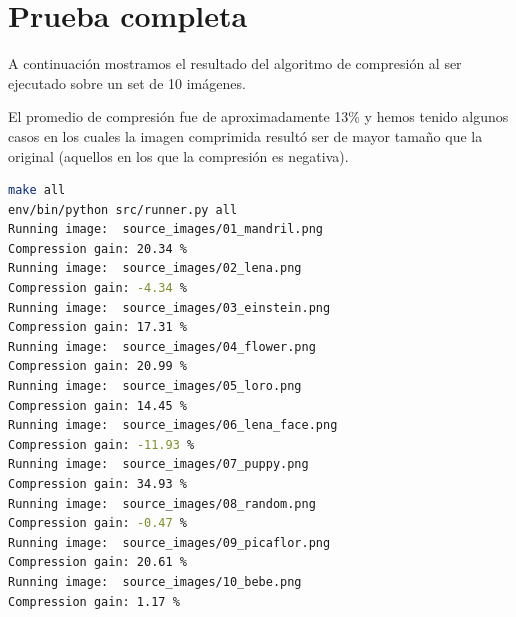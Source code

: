 \documentclass[spanish]{scrartcl}
\begin{document}
\section{Prueba completa}

A continuación mostramos el resultado del algoritmo de compresión al ser ejecutado sobre un set de 10 imágenes.

El promedio de compresión fue de aproximadamente 13\% y hemos tenido algunos casos en los cuales la imagen comprimida resultó ser de mayor tamaño que la original (aquellos en los que la compresión es negativa).

\begin{lstlisting}[language=bash]
make all
env/bin/python src/runner.py all
Running image:  source_images/01_mandril.png
Compression gain: 20.34 %
Running image:  source_images/02_lena.png
Compression gain: -4.34 %
Running image:  source_images/03_einstein.png
Compression gain: 17.31 %
Running image:  source_images/04_flower.png
Compression gain: 20.99 %
Running image:  source_images/05_loro.png
Compression gain: 14.45 %
Running image:  source_images/06_lena_face.png
Compression gain: -11.93 %
Running image:  source_images/07_puppy.png
Compression gain: 34.93 %
Running image:  source_images/08_random.png
Compression gain: -0.47 %
Running image:  source_images/09_picaflor.png
Compression gain: 20.61 %
Running image:  source_images/10_bebe.png
Compression gain: 1.17 %
\end{lstlisting}
\end{document}
